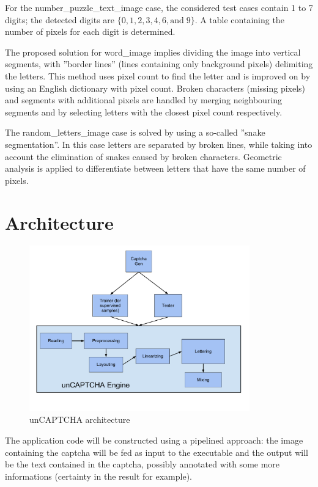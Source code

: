 \documentclass[a4paper,12pt]{article}
\begin{document}
For the number\_puzzle\_text\_image case, the considered test
cases contain 1 to 7 digits; the detected digits are $\{0, 1, 2, 3,
4, 6, \text{and}\; 9\}$. A table containing the number of pixels
for each digit is determined.

The proposed solution for word\_image implies dividing the image
into vertical segments, with ''border lines'' (lines containing only
background pixels) delimiting the letters. This method uses pixel
count to find the letter and is improved on by using an English
dictionary with pixel count. Broken characters (missing pixels)
and segments with additional pixels are handled by merging
neighbouring segments and by selecting letters with the closest
pixel count respectively.

The random\_letters\_image case is solved by using a so-called
''snake segmentation''. In this case letters are separated by
broken lines, while taking into account the elimination of snakes
caused by broken characters. Geometric analysis is applied to
differentiate between letters that have the same number of pixels.

\section{Architecture}
\label{sec:architecture}
\begin{figure}[htb]
\centering
\includegraphics[width=0.85\textwidth]{img/unCAPTCHAarchitecturedraft.pdf}
\caption{unCAPTCHA architecture}
\label{fig:architecture}
\end{figure}
The application code will be constructed using a pipelined approach: the image
containing the captcha will be fed as input to the executable and the output
will be the text contained in the captcha, possibly annotated with some more
informations (certainty in the result for example).
\end{document}
